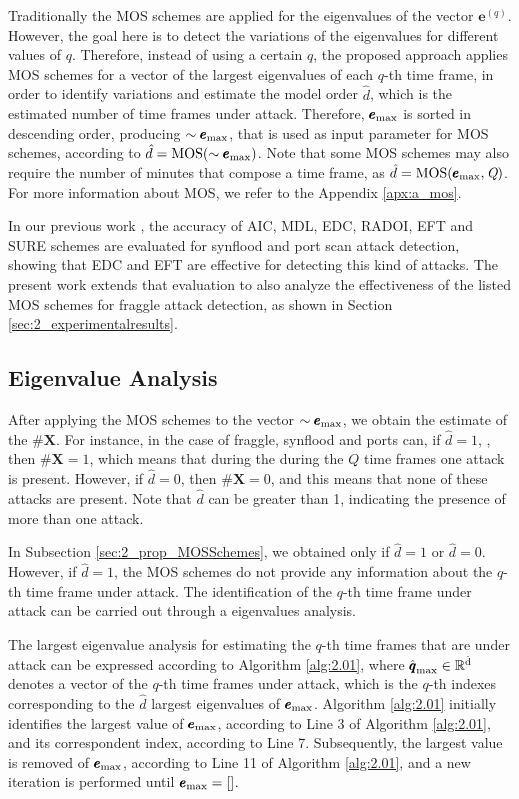 Traditionally the MOS schemes are applied for the eigenvalues of the vector $\pmb{e}^{(q)}$. However, the goal here is to detect the variations of the eigenvalues for different values of $q$. Therefore, instead of using a certain $q$, the proposed approach applies MOS schemes for a vector of the largest eigenvalues of each $q$-th time frame, in order to identify variations and estimate the model order $\hat{d}$, which is the estimated number of time frames under attack. Therefore, $\pmb{e}_{\rm max}$ is sorted in descending order, producing $\sim\pmb{e}_{\rm max}$, that is used as input parameter for MOS schemes, according to $\hat{d} = \rm{MOS}(\sim\pmb{e}_{\rm max})$. Note that some MOS schemes may also require the number of minutes that compose a time frame, as $\hat{d} = \rm{MOS}(\pmb{e}_{\rm max},\emph{Q})$. For more information about MOS, we refer to the Appendix \ref{apx:a_mos}.

In our previous work \cite{tenorio2013greatest}, the accuracy of AIC, MDL, EDC, RADOI, EFT and SURE schemes are evaluated for synflood and port scan attack detection, showing that EDC and EFT are effective for detecting this kind of attacks. The present work extends that evaluation to also analyze the effectiveness of the listed MOS schemes for fraggle attack detection, as shown in Section \ref{sec:2_experimentalresults}.

\subsection{Eigenvalue Analysis}
\label{sec:2_prop_EigenvalueAnalysis}

After applying the MOS schemes to the vector $\sim\pmb{e}_{\rm max}$, we obtain the estimate of the $\#\pmb{X}$. For instance, in the case of fraggle, synflood and ports can, if $\hat{d} = 1$, , then $\#\pmb{X} = 1$, which means that during the during the $Q$ time frames one attack is present. However, if $\hat{d} = 0$, then $\#\pmb{X} = 0$, and this means that none of these attacks are present. Note that $\hat{d}$ can be greater than 1, indicating the presence of more than one attack.

In Subsection \ref{sec:2_prop_MOSSchemes}, we obtained only if $\hat{d} = 1$ or $\hat{d} = 0$. However, if $\hat{d} = 1$, the MOS schemes do not provide any information about the $q$-th time frame under attack. The identification of the $q$-th time frame under attack can be carried out through a eigenvalues analysis.

The largest eigenvalue analysis for estimating the $q$-th time frames that are under attack can be expressed according to Algorithm \ref{alg:2.01}, where $\rm{\hat{\pmb{q}}}_{\rm max} \in \mathbb{R}^{\hat{d}}$ denotes a vector of the $q$-th time frames under attack, which is the $q$-th indexes corresponding to the $\hat{d}$ largest eigenvalues of $\pmb{e}_{\rm max}$. Algorithm \ref{alg:2.01} initially identifies the largest value of $\pmb{e}_{\rm max}$, according to Line 3 of Algorithm \ref{alg:2.01}, and its correspondent index, according to Line 7. Subsequently, the largest value is removed of $\pmb{e}_{\rm max}$, according to Line 11 of Algorithm \ref{alg:2.01}, and a new iteration is performed until $\pmb{e}_{\rm max} = []$.

